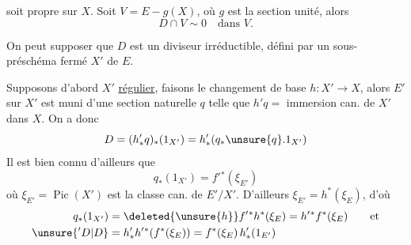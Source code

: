 soit propre sur $X$.  Soit $V=E-g(X)$, où $g$ est la section unité, alors
\[
D\cap V\sim0\quad\text{dans }V.
\]

On peut supposer que $D$ est un diviseur irréductible, défini par un sous-préschéma fermé $X'$ de $E$. 

Supposons d'abord $X'$ \uline{régulier}, faisons le changement de base $h:X'\longrightarrow X$, alors $E'$ sur $X'$ est muni d'une section naturelle $q$ telle que $h'q=$ immersion can. de $X'$ dans $X$. On a donc \inserted{(raisonnant sur Pic\ldots]}
\[
D=(h'_{*}q)_*(1_{X'})=h'_*(q_*{\unsure{q}}.1_{X'})
\]
Il est bien connu d'ailleurs que
\[
q_*(1_{X'})=f'{}^*(\xi_{E'})
\]
où $\xi_{E'}=\operatorname{Pic}(X')$ est la classe can. de $E'/X'$. D'ailleurs $\xi_{E'}=h^*(\xi_E)$, d'où
\[
\begin{aligned}
q_*(1_{X'})&=\deleted{\unsure{h}}f'{}^*h^*(\xi_E)=h'{}^*f^*(\xi_E)\qquad\text{et}\\
\unsure{{}'D|D}&=h'_*h'{}^*(f^*(\xi_E))=f^*(\xi_E)\,h'_*(1_{E'})
\end{aligned}
\]
